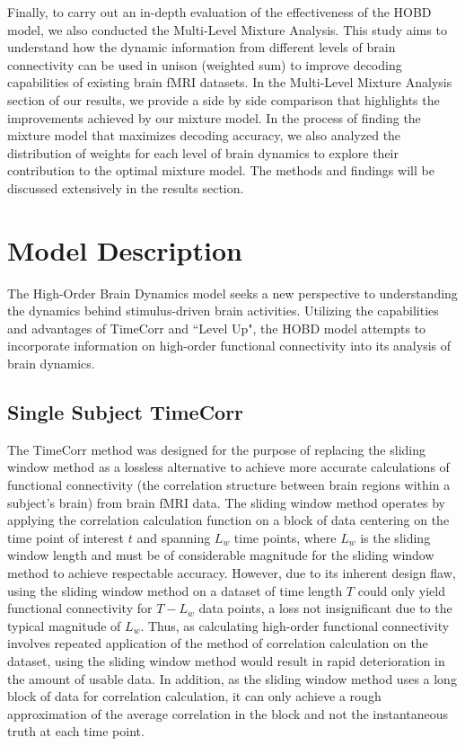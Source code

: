 \documentclass[11pt]{article}
\begin{document}
Finally, to carry out an in-depth evaluation of the effectiveness of the HOBD model, we also conducted the Multi-Level Mixture Analysis. This study aims to understand how the dynamic information from different levels of brain connectivity can be used in unison (weighted sum) to improve decoding capabilities of existing brain fMRI datasets. In the Multi-Level Mixture Analysis section of our results, we provide a side by side comparison that highlights the improvements achieved by our mixture model. In the process of finding the mixture model that maximizes decoding accuracy, we also analyzed the distribution of weights for each level of brain dynamics to explore their contribution to the optimal mixture model. The methods and findings will be discussed extensively in the results section.

\newpage
\section{Model Description}
The High-Order Brain Dynamics model seeks a new perspective to understanding the dynamics behind stimulus-driven brain activities. Utilizing the capabilities and advantages of TimeCorr and ``Level Up", the HOBD model attempts to incorporate information on high-order functional connectivity into its analysis of brain dynamics.

\subsection{Single Subject TimeCorr}
The TimeCorr method was designed for the purpose of replacing the sliding window method as a lossless alternative to achieve more accurate calculations of functional connectivity (the correlation structure between brain regions within a subject's brain) from brain fMRI data. The sliding window method operates by applying the correlation calculation function on a block of data centering on the time point of interest $t$ and spanning $L_w$ time points, where $L_w$ is the sliding window length and must be of considerable magnitude for the sliding window method to achieve respectable accuracy. However, due to its inherent design flaw, using the sliding window method on a dataset of time length $T$ could only yield functional connectivity for $T-L_w$ data points, a loss not insignificant due to the typical magnitude of $L_w$. Thus, as calculating high-order functional connectivity involves repeated application of the method of correlation calculation on the dataset, using the sliding window method would result in rapid deterioration in the amount of usable data. In addition, as the sliding window method uses a long block of data for correlation calculation, it can only achieve a rough approximation of the average correlation in the block and not the instantaneous truth at each time point.
\end{document}
